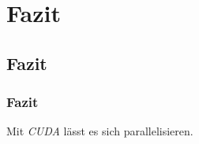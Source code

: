 \documentclass[german,notes,18pt]{beamer}
\begin{document}
	
	\section{Fazit}
	\subsection{Fazit}
	\begin{frame}
		\frametitle{Fazit}
		
		\LARGE
		\centering
		Mit \emph{CUDA} lässt es sich parallelisieren.
	\end{frame}
\end{document}
